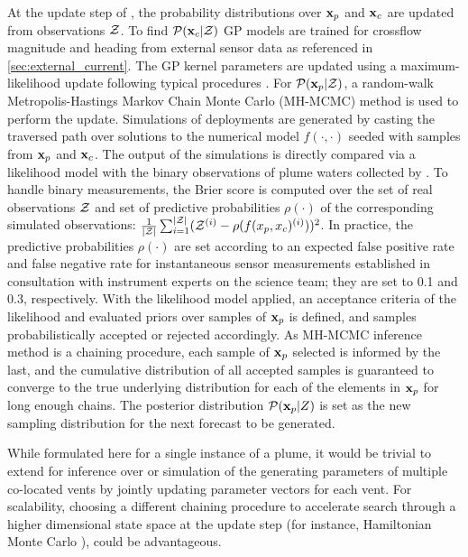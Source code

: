 At the update step of \PHUMES, the probability distributions over $\mathbf{x}_p$ and $\mathbf{x}_c$ are updated from observations $\mathcal{Z}$. To find $\mathcal{P}(\mathbf{x}_c|\mathcal{Z})$ GP models are trained for crossflow magnitude and heading from external sensor data as referenced in \cref{sec:external_current}. The GP kernel parameters are updated using a maximum-likelihood update following typical procedures \autocite{Rasmussen2004}. For $\mathcal{P}(\mathbf{x}_p | \mathcal{Z})$, a random-walk Metropolis-Hastings Markov Chain Monte Carlo (MH-MCMC) method \autocite{metropolis1953equation} is used to perform the update. Simulations of deployments are generated by casting the traversed path over solutions to the numerical model $f(\cdot, \cdot)$ seeded with samples from $\mathbf{x}_p$ and $\mathbf{x}_c$. The output of the simulations is directly compared via a likelihood model with the binary observations of plume waters collected by \Sentry. To handle binary measurements, the Brier score \autocite{brier1950verification} is computed over the set of real observations $\mathcal{Z}$ and set of predictive probabilities $\rho(\cdot)$ of the corresponding simulated observations: $\frac{1}{|\mathcal{Z}|}\sum_{i=1}^{|\mathcal{Z}|} (\mathcal{Z}^{(i)} - \rho(f(x_p, x_c)^{(i)}))^2$. In practice, the predictive probabilities $\rho(\cdot)$ are set according to an expected false positive rate and false negative rate for instantaneous sensor measurements established in consultation with instrument experts on the science team; they are set to 0.1 and 0.3, respectively. With the likelihood model applied, an acceptance criteria of the likelihood and evaluated priors over samples of $\mathbf{x}_p$ is defined, and samples probabilistically accepted or rejected accordingly. As MH-MCMC inference method is a chaining procedure, each sample of $\mathbf{x}_p$ selected is informed by the last, and the cumulative distribution of all accepted samples is guaranteed to converge to the true underlying distribution for each of the elements in $\mathbf{x}_p$ for long enough chains. The posterior distribution $\mathcal{P}(\mathbf{x}_p | Z)$ is set as the new sampling distribution for the next forecast to be generated.

While formulated here for a single instance of a plume, it would be trivial to extend \PHUMES for inference over or simulation of the generating parameters of multiple co-located vents by jointly updating parameter vectors for each vent. For scalability, choosing a different chaining procedure to accelerate search through a higher dimensional state space at the update step (for instance, Hamiltonian Monte Carlo \autocite{duane1987hybrid}), could be advantageous.



